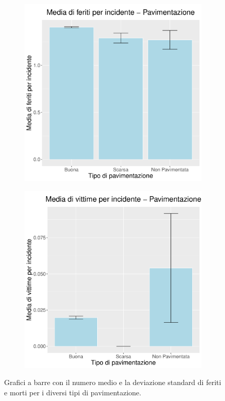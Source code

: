 \documentclass[12pt,a4paper,final,oneside]{article}			%
\begin{document}
        \begin{figure}[h]
            \begin{subfigure}{0.4\textwidth}
                \centering
                \includegraphics[scale=0.4]{../results/media_feriti_per_incidenti_pavimentazione.pdf}
            \end{subfigure}
            \hfill
            \begin{subfigure}{0.4\textwidth}
                \centering
                \includegraphics[scale=0.4]{../results/media_morti_per_incidenti_pavimentazione.pdf}
            \end{subfigure}
            \caption{Grafici a barre con il numero medio e la deviazione standard di feriti e morti per i diversi tipi di pavimentazione.}
            \label{Fig: morti_feriti_pavimentazione}
        \end{figure}   
\end{document}
